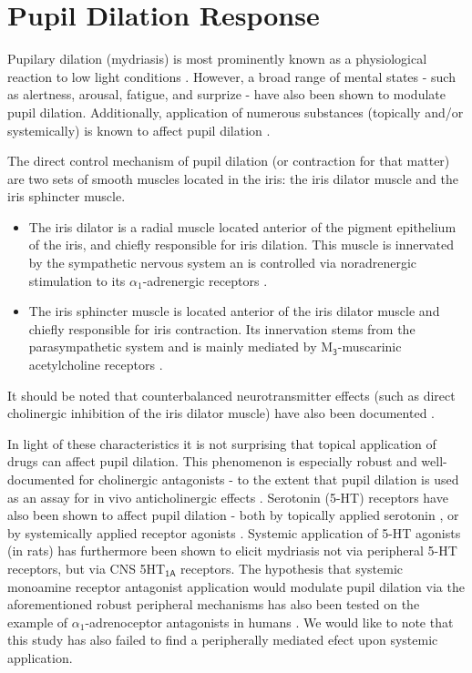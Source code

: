     \section{Pupil Dilation Response}
	Pupilary dilation (mydriasis) is most prominently known as a physiological reaction to low light conditions \cite{Ellis1981}. 
	However, a broad range of mental states - 
	such as alertness\cite{Yoss1970}, arousal\cite{Bradshaw1967}, fatigue\cite{Morad2000}, and surprize\cite{Preuschoff2011} -
	have also been shown to modulate pupil dilation.
	Additionally, application of numerous substances (topically and/or systemically) is known to affect pupil dilation \cite{Theofilopoulos1988, Bye1979, Phillips2000}.
	
	The direct control mechanism of pupil dilation (or contraction for that matter) are two sets of smooth muscles located in the iris: the iris dilator muscle and the iris sphincter muscle.
	\begin{itemize}
	    \item The iris dilator is a radial muscle located anterior of the pigment epithelium of the iris, and chiefly responsible for iris dilation.
	    This muscle is innervated by the sympathetic nervous system an is controlled via noradrenergic stimulation to its $\alpha_1$-adrenergic receptors \cite{vanAlphen1976}.
	    \item The iris sphincter muscle is located anterior of the iris dilator muscle and chiefly responsible for iris contraction.
	    Its innervation stems from the parasympathetic system and is mainly mediated by M$\mathsf{_3}$-muscarinic acetylcholine receptors \cite{Woldemussie1993,Taylor1974}.
	\end{itemize}
	It should be noted that counterbalanced neurotransmitter effects (such as direct cholinergic inhibition of the iris dilator muscle) have also been documented \cite{Yoshitomi1985}.
	
	In light of these characteristics it is not surprising that topical application of drugs can affect pupil dilation.
	This phenomenon is especially robust and well-documented for cholinergic antagonists \cite{Gambill1967} -
	to the extent that pupil dilation is used as an assay for in vivo anticholinergic effects \cite{Bye1979}.
	Serotonin (5-HT) receptors have also been shown to affect pupil dilation - both by topically applied serotonin \cite{KOELLA1962}, or by systemically applied receptor agonists \cite{Yu2004}.
	Systemic application of 5-HT agonists (in rats) has furthermore been shown to elicit mydriasis not via peripheral 5-HT receptors, but via CNS 5HT$\mathsf{_{1A}}$ receptors.
	The hypothesis that systemic monoamine receptor antagonist application would modulate pupil dilation via the aforementioned robust peripheral mechanisms has also been tested on the example of $\alpha_1$-adrenoceptor antagonists in humans \cite{Cooney2012}.
	We would like to note that this study has also failed to find a peripherally mediated efect upon systemic application. 
	
